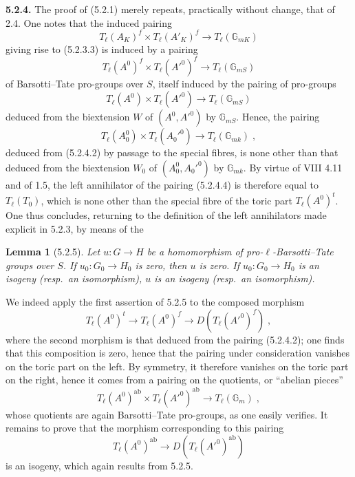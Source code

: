 \documentclass[11pt]{article}
\theoremstyle{plain}
\newtheorem{lemme}[theorem]{Lemma}
\theoremstyle{definition}
\theoremstyle{remark}
\newcommand{\GG}{\mathbb G}
\newcommand{\Tl}{T_\ell}
\newcommand{\ab}{\mathrm{ab}}
\begin{document}
\medskip

\noindent\textbf{5.2.4.} The proof of (5.2.1) merely repeats, practically
without change, that of 2.4. One notes that the induced pairing
\begin{equation}
\Tl(A_K)^f \times \Tl(A'_K)^f \longrightarrow \Tl(\GG_{mK})
\end{equation}
giving rise to (5.2.3.3) is induced by a pairing
\begin{equation}
\Tl(A^0)^f \times \Tl(A'^0)^f \longrightarrow \Tl(\GG_{mS})
\end{equation}
of Barsotti--Tate pro-groups over $S$, itself induced by the pairing of
pro-groups
\begin{equation}
\Tl(A^0) \times \Tl(A'^0) \longrightarrow \Tl(\GG_{mS})
\end{equation}
deduced from the biextension $W$ of $(A^0, A'^0)$ by $\GG_{mS}$. Hence,
the pairing
\begin{equation}
\Tl(A_0^0) \times \Tl(A_0'^0) \longrightarrow \Tl(\GG_{mk})
\; ,
\end{equation}
deduced from (5.2.4.2) by passage to the special fibres, is none other
than that deduced from the biextension $W_0$ of $(A_0^0, A_0'^0)$ by
$\GG_{mk}$. By virtue of VIII 4.11 and of 1.5, the left annihilator of
the pairing (5.2.4.4) is therefore equal to $\Tl(T_0)$, which is none
other than the special fibre of the toric part $\Tl(A^0)^t$. One thus
concludes, returning to the definition of the left annihilators made
explicit in 5.2.3, by means of the

\begin{lemme}[5.2.5]
Let $u \colon G \to H$ be a homomorphism of pro-$\ell$-Barsotti--Tate
groups over $S$. If $u_0 \colon G_0 \to H_0$ is zero, then $u$ is zero.
If $u_0 \colon G_0 \to H_0$ is an isogeny \emph{(resp.~an isomorphism)},
$u$ is an isogeny \emph{(resp.~an isomorphism)}.
\end{lemme}

We indeed apply the first assertion of 5.2.5 to the composed morphism
\[
\Tl(A^0)^t \longrightarrow \Tl(A^0)^f \longrightarrow
D(\Tl(A'^0)^f) \; ,
\]
where the second morphism is that deduced from the pairing (5.2.4.2);
one finds that this composition is zero, hence that the pairing under
consideration vanishes on the toric part on the left. By symmetry, it
therefore vanishes on the toric part on the right, hence it comes from a
pairing on the quotients, or ``abelian pieces''
\[
\Tl(A^0)^{\ab} \times \Tl(A'^0)^{\ab} \longrightarrow \Tl(\GG_m)
\; ,
\]
whose quotients are again Barsotti--Tate pro-groups, as one easily
verifies. It remains to prove that the morphism corresponding to this
pairing
\[
\Tl(A^0)^{\ab} \longrightarrow D(\Tl(A'^0)^{\ab})
\]
is an isogeny, which again results from 5.2.5.
\end{document}
